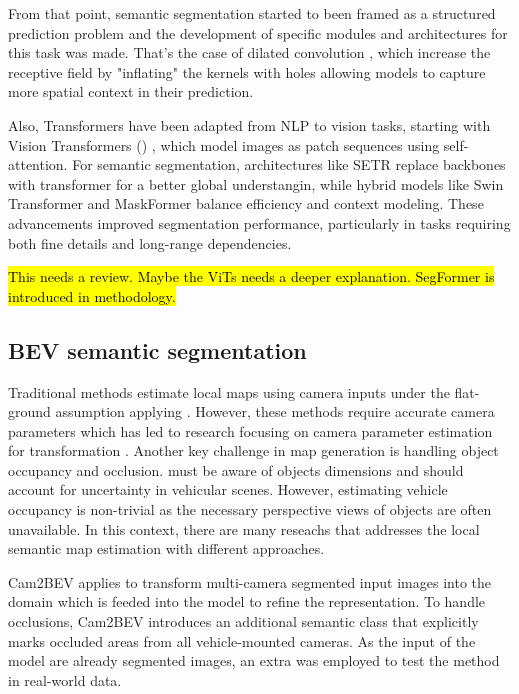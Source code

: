 From that point, semantic segmentation started to been framed as a structured prediction problem and the development of specific modules and architectures for this task was made. That's the case of dilated convolution \cite{ditaled_conv}, which increase the receptive field by "inflating" the  kernels with holes allowing models to capture more spatial context in their prediction.

Also, Transformers have been adapted from NLP to vision tasks, starting with Vision Transformers () \cite{vit}, which model images as patch sequences using self-attention. For semantic segmentation, architectures like SETR \cite{SETR} replace  backbones with transformer for a better global understangin, while hybrid models like Swin Transformer \cite{swin} and MaskFormer balance efficiency and context modeling. These advancements improved segmentation performance, particularly in tasks requiring both fine details and long-range dependencies.

\hl{This needs a review. Maybe the ViTs needs a deeper explanation. SegFormer is introduced in methodology.}

\subsection{BEV semantic segmentation} \label{sota_BEV_semantic_segmentation}
Traditional methods \cite{3d_traffic_scene_understanding} estimate local  maps using camera inputs under the flat-ground assumption applying . However, these methods require accurate camera parameters which has led to research focusing on camera parameter estimation for  transformation \cite{BEV_params_estimation1} \cite{BEV_params_estimation2}. Another key challenge in  map generation is handling object occupancy and occlusion.  must be aware of objects dimensions and should account for uncertainty in vehicular scenes. However, estimating vehicle occupancy is non-trivial as the necessary perspective views of objects are often unavailable. In this context, there are many reseachs that addresses the local semantic map estimation with different approaches.

Cam2BEV \cite{Cam2BEV} applies  to transform multi-camera segmented input images into the  domain which is feeded into the model to refine the  representation. To handle occlusions, Cam2BEV introduces an additional semantic class that explicitly marks occluded areas from all vehicle-mounted cameras. As the input of the model are already segmented images, an extra  was employed to test the method in real-world data.  

